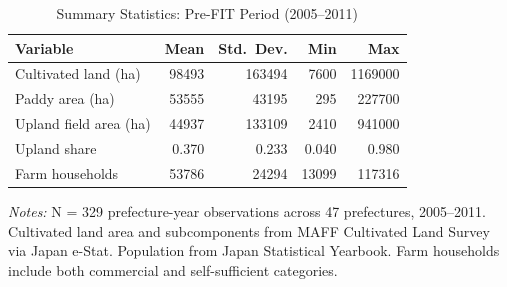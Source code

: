 \begin{table}[H]
\centering
\caption{Summary Statistics: Pre-FIT Period (2005--2011)}
\begin{threeparttable}
\begin{tabular}{lrrrr}
\toprule
Variable & Mean & Std.\ Dev. & Min & Max \\
\midrule
Cultivated land (ha) & 98493 & 163494 & 7600 & 1169000 \\
Paddy area (ha) & 53555 & 43195 & 295 & 227700 \\
Upland field area (ha) & 44937 & 133109 & 2410 & 941000 \\
Upland share & 0.370 & 0.233 & 0.040 & 0.980 \\
Farm households & 53786 & 24294 & 13099 & 117316 \\
\bottomrule
\end{tabular}
\begin{tablenotes}[flushleft]
\small
\item \textit{Notes:} N = 329 prefecture-year observations across 47 prefectures, 2005--2011. Cultivated land area and subcomponents from MAFF Cultivated Land Survey via Japan e-Stat. Population from Japan Statistical Yearbook. Farm households include both commercial and self-sufficient categories.
\end{tablenotes}
\end{threeparttable}
\label{tab:summary}
\end{table}

